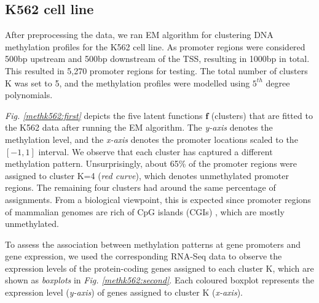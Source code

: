 \subsection{K562 cell line} \label{meth-encode-k562-subsect}
After preprocessing the data, we ran EM algorithm for clustering DNA methylation profiles for the K562 cell line. As promoter regions were considered 500bp upstream and 500bp downstream of the TSS, resulting in 1000bp in total. This resulted in 5,270 promoter regions for testing. The total number of clusters K was set to 5, and the methylation profiles were modelled using $5^{th}$ degree polynomials. 

\emph{Fig. \ref{methk562:first}} depicts the five latent functions $\mathbf{f}$ (\ie clusters) that are fitted to the K562 data after running the EM algorithm. The \emph{y-axis} denotes the methylation level, and the \emph{x-axis} denotes the promoter locations scaled to the $[-1, 1]$ interval. We observe that each cluster has captured a different methylation pattern. Unsurprisingly, about 65\% of the promoter regions were assigned to cluster K=4 (\emph{red curve}), which denotes unmethylated promoter regions. The remaining four clusters had around the same percentage of assignments. From a biological viewpoint, this is expected since promoter regions of mammalian genomes are rich of CpG islands (CGIs) \citep{Illingworth2009}, which are mostly unmethylated. 

To assess the association between methylation patterns at gene promoters and gene expression, we used the corresponding RNA-Seq data to observe the expression levels of the protein-coding genes assigned to each cluster K, which are shown as \emph{boxplots} in \emph{Fig. \ref{methk562:second}}. Each coloured boxplot represents the expression level (\emph{y-axis}) of genes assigned to cluster K (\emph{x-axis}). 


